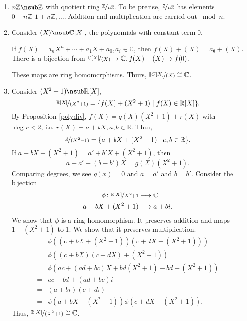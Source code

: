 \begin{example}
    \leavevmode
    \begin{enumerate}
        \item \(n\mathbb{Z}\nsub \mathbb{Z}\) with quotient ring \(\nicefrac{\mathbb{Z}}{n\mathbb{Z}}\). To be precise, \(\nicefrac{\mathbb{Z}}{n\mathbb{Z}}\) has elements \(0 + n\mathbb{Z}, 1 + n\mathbb{Z}, \ldots\).
        Addition and multiplication are carried out \(\bmod n\).
        \item Consider \((X) \nsub \mathbb{C}[X]\), the polynomials with constant term \(0\).

        If \(f(X) = a_n X^n + \cdots + a_1 X + a_0, a_i \in \mathbb{C}\), then \(f(X) + (X) = a_0 + (X)\). There is a bijection from \(\nicefrac{\mathbb{C}[X]}{(X)} \to \mathbb{C}, f(X) + (X) \mapsto f(0)\).

        These maps are ring homomorphisms. Thurs, \(\nicefrac{\|C[X]}{(X)}\cong \mathbb{C}\).
        \item Consider \((X^2 + 1) \nsub \mathbb{R}[X]\),
        \[
            \nicefrac{\mathbb{R}[X]}{(X^2 + 1)} = \{f(X) + (X^2 + 1)\mid f(X) \in \mathbb{R}[X]\}.
        \]
        By Proposition \eqref{polydiv}, \(f(X) = q(X)(X^2 + 1) + r(X)\) with \(\deg r < 2\), i.e. \(r(X) = a + bX, a,b \in \mathbb{R}\). Thus,
        \[\nicefrac{\mathbb{R}}{(X^2 + 1)} = \{a + bX + (X^{2} + 1)\mid a, b \in \mathbb{R}\}.\]
        If \(a + bX + (X^2 + 1) = a' + b'X + (X^2 + 1)\), then
        \[a - a' + (b - b')X = g(X)(X^2 + 1).\]
        Comparing degrees, we see \(g(x) = 0\) and \(a = a'\) and \(b = b'\). Consider the bijection
        \begin{equation*}
        \begin{aligned}
          \phi \colon \nicefrac{\mathbb{R}[X]}{X^2 + 1} & \longrightarrow \mathbb{C} \\
                    a + bX + (X^2 + 1) & \longmapsto a + b i.
        \end{aligned}
        \end{equation*}
        We show that \(\phi\) is a ring homomorphism. It preserves addition and maps \(1 + (X^2 + 1)\) to 1. We show that it preserves multiplication.
        \begin{align*}
            &\phi((a + bX + (X^2 + 1))(c + dX + (X^2 + 1)))\\
            =&\phi((a + bX)(c+dX) + (X^2 + 1))\\
            =&\phi(ac + (ad + bc)X + bd(X^2 + 1) - bd + (X^2 + 1))\\
            =&ac - bd + (ad + bc)i\\
            =&(a+bi)(c + di)\\
            =&\phi(a + bX + (X^2 + 1))\phi(c + dX + (X^2 + 1)).
        \end{align*}
        Thus, \(\nicefrac{\mathbb{R}[X]}{(X^2 + 1)} \cong \mathbb{C}\).
    \end{enumerate}
\end{example}